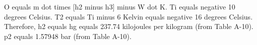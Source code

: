 O equals m dot times [h2 minus h3] minus W dot K.  
Ti equals negative 10 degrees Celsius.  
T2 equals Ti minus 6 Kelvin equals negative 16 degrees Celsius.  
Therefore, h2 equals hg equals 237.74 kilojoules per kilogram (from Table A-10).  
p2 equals 1.57948 bar (from Table A-10).